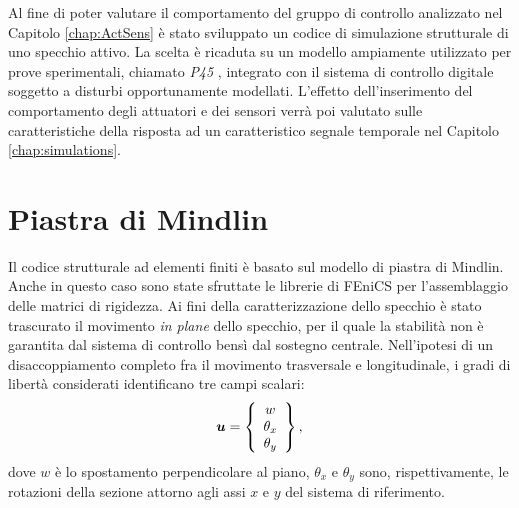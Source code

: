 


\label{chap:mirror}
Al fine di poter valutare il comportamento del gruppo di controllo analizzato nel Capitolo \ref{chap:ActSens} è stato sviluppato un codice di simulazione strutturale di uno specchio attivo. La scelta è ricaduta su un modello ampiamente utilizzato per prove sperimentali, chiamato \textit{P45} \citep{manettiphd}, integrato con il sistema di controllo digitale soggetto a disturbi opportunamente modellati. L'effetto dell'inserimento del comportamento degli attuatori e dei sensori verrà poi valutato sulle caratteristiche della risposta ad un caratteristico segnale temporale nel Capitolo \ref{chap:simulations}.

\section{Piastra di Mindlin}
Il codice strutturale ad elementi finiti è basato sul modello di piastra di Mindlin. Anche in questo caso sono state sfruttate le librerie di FEniCS per l'assemblaggio delle matrici di rigidezza.
Ai fini della caratterizzazione dello specchio è stato trascurato il movimento \textit{in plane} dello specchio, per il quale la stabilità non è garantita dal sistema di controllo bensì dal sostegno centrale. Nell'ipotesi di un disaccoppiamento completo fra il movimento trasversale e longitudinale, i gradi di libertà considerati identificano tre campi scalari:
\begin{equation}
\label{eq:7plv1}
\boldsymbol{u} = \left\{
\begin{array}{c}
w\\ \theta_x\\ \theta_y\end{array}\right\},
\end{equation}
dove $w$ è lo spostamento perpendicolare al piano, $\theta_x$ e $\theta_y$ sono, rispettivamente, le rotazioni della sezione attorno agli assi $x$ e $y$ del sistema di riferimento. 

